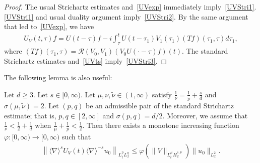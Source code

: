 \documentclass[10pt,a4paper]{amsart}
\newcommand{\CR}{\mathcal{R}}
\newcommand{\ph}{\varphi}
\newcommand{\ta}{\tau}
\newcommand{\si}{\sigma}
\newcommand{\wt}{\widetilde}
\newcommand{\I}{\infty}
\newcommand{\sd}{\langle \nabla \rangle}
\newcommand{\tw}{\frac{1}{2}}
\begin{document}
\begin{proof}
The usual Strichartz estimates and~\eqref{UVexp} immediately imply~\eqref{UVStri1}. \eqref{UVStri1} and usual duality argument imply~\eqref{UVStri2}. By the same argument that led to~\eqref{UVexp}, we have
\begin{align}\label{UVts}
U_V(t,\ta)f = U(t-\ta)f - i \int_\ta^t U(t-\ta_1) V_1(\ta_1) (Tf)(\ta_1,\ta) d\ta_1,
\end{align}
where $(Tf)(\ta_1,\ta)= \CR(V_0,V_1)(V_0U(\cdot-\ta)f)(t)$. The standard Strichartz estimates and~\eqref{UVts} imply~\eqref{UVStri3}.
\end{proof}

The following lemma is also useful:

\begin{lemm} \label{almost commu}
Let $d \ge 3$. Let $s \in [0,\I)$. Let $\mu, \nu,\wt{\nu} \in (1, \I)$ satisfy $\frac{1}{\nu} = \frac{1}{\wt{\nu}} + \frac{s}{d}$ and $\si(\mu,\wt{\nu})=2$. Let $(p,q)$ be an admissible pair of the standard Strichartz estimate; that is, $p, q \in [2,\I]$ and $\si(p,q) = d/2$. Moreover, we assume that $\frac{1}{\nu} < \tw + \frac{1}{d}$ when $\frac{1}{\mu}+\frac{1}{p}<\tw$. Then there exists a monotone increasing function $\ph:[0,\I) \to [0,\I)$ such that
\begin{align}
\left\|\sd^s U_V(t) \sd^{-s} u_0\right\|_{L^p_t L^q_x} \le \ph\left(\|V\|_{L^\mu_t H^{s,\nu}_x}\right) \|u_0\|_{L^2_x}.
\end{align}
\end{lemm}
\end{document}
